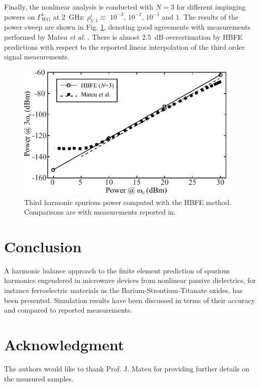 \documentclass[journal,twoside,letterpaper]{IEEEtran}
\begin{document}
Finally, the nonlinear analysis is conducted with $N=3$ for different impinging powers on $\Gamma^1_\text{WG}$ at 2~GHz: $\rho^i_{1:1} \equiv$ $10^{-3}$, $10^{-2}$,  $10^{-1}$ and $1$.  
The results of the power sweep are shown in Fig. \ref{fig:third_harm}, denoting good agreements with measurements performed by Mateu \textit{et al.} \cite{mateu2006measurements}. There is almost 2.5~dB overestimation by HBFE predictions with respect to the reported linear interpolation of the third order signal measurements.
%
\begin{figure}[ht!]
\centering
\includegraphics[width=\columnwidth]{third_harm}
\caption{Third harmonic spurious power computed with the HBFE method. Comparisons are with measurements reported in\cite{mateu2006measurements}.}
\label{fig:third_harm}
\end{figure}
%

\section{Conclusion}
A harmonic balance approach to the finite element prediction of spurious harmonics engendered in microwave devices from nonlinear passive dielectrics, for instance ferroelectric materials as the Barium-Strontium-Titanate oxides, has been presented. Simulation results have been discussed in terms of their accuracy and compared to reported measurements.

\section{Acknowledgment}
The authors would like to thank Prof. J. Mateu for providing further details on the measured samples.



\end{document}
